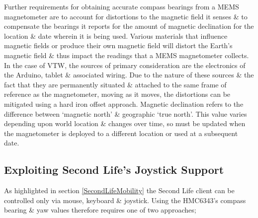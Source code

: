 Further requirements for obtaining accurate compass bearings from a MEMS magnetometer are to account for distortions to the magnetic field it senses \& to compensate the bearings it reports for the amount of magnetic declination for the location \& date wherein it is being used. Various materials that influence magnetic fields or produce their own magnetic field will distort the Earth's magnetic field \& thus impact the readings that a MEMS magnetometer collects. In the case of VTW, the sources of primary consideration are the electronics of the Arduino, tablet \& associated wiring. Due to the nature of these sources \& the fact that they are permanently situated \& attached to the same frame of reference as the magnetometer, moving as it moves, the distortions can be mitigated using a hard iron offset approach. Magnetic declination refers to the difference between `magnetic north' \& geographic `true north'. This value varies depending upon world location \& changes over time, so must be updated when the magnetometer is deployed to a different location or used at a subsequent date.



\subsection{Exploiting Second Life's Joystick Support}

\label{exploitJoystick}

\newcommand{\ArduinoJoystickVideoFootnote}{\footnote{\url{https://www.youtube.com/watch?v=-ddtmqoGNmg}}}

\newcommand{\atmegaFootnote}{\footnote{\url{http://www.atmel.com/devices/ATMEGA16U2.aspx}}}

\newcommand{\atmegaTFootnote}{\footnote{\url{http://www.atmel.com/devices/atmega328.aspx}}}

\newcommand{\arduinousbhidFootnote}{\footnote{\url{http://hunt.net.nz/users/darran/weblog/a3599/}}}

\newcommand{\lufaFootnote}{\footnote{\url{http://www.fourwalledcubicle.com/LUFA.php}}}


As highlighted in section \ref{SecondLifeMobility} the Second Life client can be controlled only via mouse, keyboard \& joystick. Using the HMC6343's compass bearing \& yaw values therefore requires one of two approaches;

